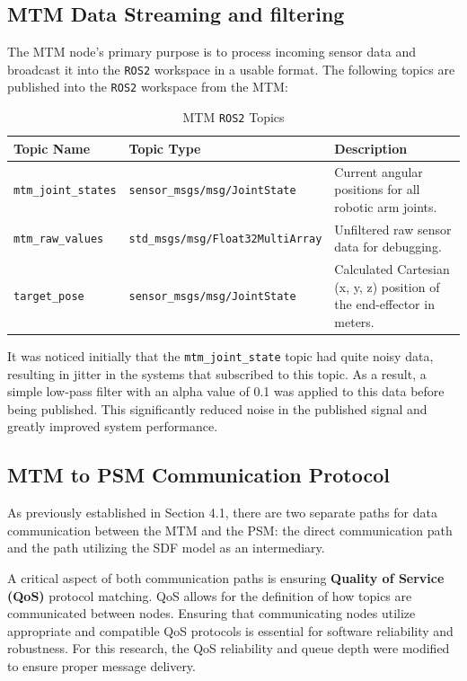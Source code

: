 \subsection{MTM Data Streaming and filtering}

The MTM node's primary purpose is to process incoming sensor data and broadcast it into the \texttt{ROS2} workspace in a usable format. The following topics are published into the \texttt{ROS2} workspace from the MTM:

\begin{table}[H]
    \centering
    \caption{MTM \texttt{ROS2} Topics}
    \label{tab:mtm_ros2_topics}
    \begin{tabular}{|l|l|p{5cm}|} %
        \hline
        \textbf{Topic Name} & \textbf{Topic Type} & \textbf{Description} \\
        \hline
        \texttt{mtm\_joint\_states} & \texttt{sensor\_msgs/msg/JointState} & Current angular positions for all robotic arm joints. \\
        \hline
        \texttt{mtm\_raw\_values} & \texttt{std\_msgs/msg/Float32MultiArray} & Unfiltered raw sensor data for debugging. \\
        \hline
        \texttt{target\_pose} & \texttt{sensor\_msgs/msg/JointState} & Calculated Cartesian (x, y, z) position of the end-effector in meters. \\
        \hline
    \end{tabular}
\end{table}

It was noticed initially that the \texttt{mtm\_joint\_state} topic had quite noisy data, resulting in jitter in the systems that subscribed to this topic. As a result, a simple low-pass filter with an alpha value of 0.1 was applied to this data before being published. This significantly reduced noise in the published signal and greatly improved system performance.

\subsection{MTM to PSM Communication Protocol}

As previously established in Section 4.1, there are two separate paths for data communication between the MTM and the PSM: the direct communication path and the path utilizing the SDF model as an intermediary.

A critical aspect of both communication paths is ensuring \textbf{Quality of Service (QoS)} protocol matching. QoS allows for the definition of how topics are communicated between nodes. Ensuring that communicating nodes utilize appropriate and compatible QoS protocols is essential for software reliability and robustness. For this research, the QoS reliability and queue depth were modified to ensure proper message delivery.

